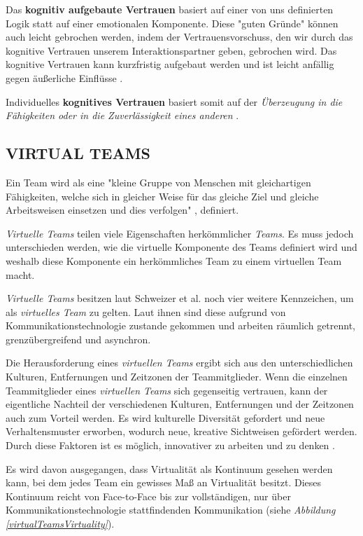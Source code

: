 \documentclass[sigchi]{acmart}
\begin{document}
Das \textbf{kognitiv aufgebaute Vertrauen} basiert auf einer von uns definierten Logik statt auf einer emotionalen Komponente. Diese "guten Gründe" können auch leicht gebrochen werden, indem der Vertrauensvorschuss, den wir durch das kognitive Vertrauen unserem Interaktionspartner geben, gebrochen wird.
Das kognitive Vertrauen kann kurzfristig aufgebaut werden und ist leicht anfällig gegen äußerliche Einflüsse \citep[S. 970]{lewis1985trust}. 

Individuelles \textbf{kognitives Vertrauen} basiert somit auf der \textit{Überzeugung in die Fähigkeiten oder in die Zuverlässigkeit eines anderen} \citep[S. 30]{mcallister1995affect}.

\subsection{VIRTUAL TEAMS}
Ein Team wird als eine "kleine Gruppe von Menschen mit gleichartigen Fähigkeiten, welche sich in gleicher Weise für das gleiche Ziel und gleiche Arbeitsweisen einsetzen und dies verfolgen" \citep[S. 2]{zenun2007effects}, definiert.

\textit{Virtuelle Teams} teilen viele Eigenschaften herkömmlicher \textit{Teams}. Es muss jedoch unterschieden werden, wie die virtuelle Komponente des Teams definiert wird und weshalb diese Komponente ein herkömmliches Team zu einem virtuellen Team macht.

\textit{Virtuelle Teams} besitzen laut Schweizer et al. \citep[S. 270]{schweitzer2010conceptualizing} noch vier weitere Kennzeichen, um als \textit{virtuelles Team} zu gelten. Laut ihnen sind diese aufgrund von Kommunikationstechnologie zustande gekommen und arbeiten räumlich getrennt, grenzübergreifend und asynchron.

Die Herausforderung eines \textit{virtuellen Teams} ergibt sich aus den unterschiedlichen Kulturen, Entfernungen und Zeitzonen der Teammitglieder. Wenn die einzelnen Teammitglieder eines \textit{virtuellen Teams} sich gegenseitig vertrauen, kann der eigentliche Nachteil der verschiedenen Kulturen, Entfernungen und der Zeitzonen auch zum Vorteil werden. Es wird kulturelle Diversität gefordert und neue Verhaltensmuster erworben, wodurch neue, kreative Sichtweisen gefördert werden. Durch diese Faktoren ist es möglich, innovativer zu arbeiten und zu denken \citep{dyer1995team} \citep[S. 405-416]{milliken1996searching}.

Es wird davon ausgegangen, dass Virtualität als Kontinuum gesehen werden kann, bei dem jedes Team ein gewisses Maß an Virtualität besitzt. Dieses Kontinuum reicht von Face-to-Face bis zur vollständigen, nur über Kommunikationstechnologie stattfindenden Kommunikation \citep{martins2004virtual} (siehe \textit{Abbildung \ref{virtualTeamsVirtuality}}).
\end{document}
